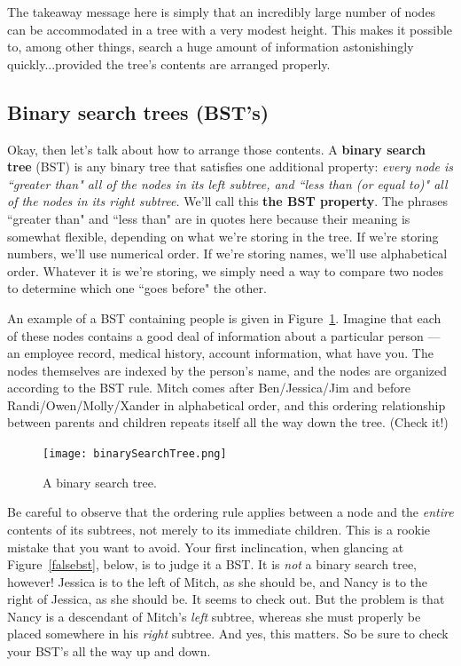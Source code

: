 The takeaway message here is simply that an incredibly large number of
nodes can be accommodated in a tree with a very modest height. This makes
it possible to, among other things, search a huge amount of information
astonishingly quickly...provided the tree's contents are arranged properly.

\subsection{Binary search trees (BST's)}

Okay, then let's talk about how to arrange those contents. A \textbf{binary
search tree} (BST) is any binary tree that satisfies one additional
property: \textit{every node is ``greater than" all of the nodes in its
left subtree, and ``less than (or equal to)" all of the nodes in its right
subtree.} We'll call this \textbf{the BST property}. The phrases ``greater
than" and ``less than" are in quotes here because their meaning is somewhat
flexible, depending on what we're storing in the tree.  If we're storing
numbers, we'll use numerical order. If we're storing names, we'll use
alphabetical order. Whatever it is we're storing, we simply need a way to
compare two nodes to determine which one ``goes before" the other.

An example of a BST containing people is given in Figure~\ref{bst}. Imagine
that each of these nodes contains a good deal of information about a
particular person --- an employee record, medical history, account
information, what have you. The nodes themselves are indexed by the
person's name, and the nodes are organized according to the BST rule. Mitch
comes after Ben/Jessica/Jim and before Randi/Owen/Molly/Xander in
alphabetical order, and this ordering relationship between parents and
children repeats itself all the way down the tree. (Check it!)

\begin{figure}[ht]
\centering
\texttt{[image: binarySearchTree.png]}
\caption{A binary search tree.}
\label{bst}
\end{figure}

Be careful to observe that the ordering rule applies between a node and the
\textit{entire} contents of its subtrees, not merely to its immediate
children. This is a rookie mistake that you want to avoid. Your first
inclincation, when glancing at Figure~\ref{falsebst}, below, is to judge it
a BST. It is \textit{not} a binary search tree, however! Jessica is to the
left of Mitch, as she should be, and Nancy is to the right of Jessica, as
she should be. It seems to check out. But the problem is that Nancy is a
descendant of Mitch's \textit{left} subtree, whereas she must properly be
placed somewhere in his \textit{right} subtree. And yes, this matters. So
be sure to check your BST's all the way up and down.

